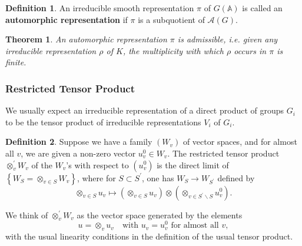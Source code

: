 \documentclass[11pt,english]{smfart}
\newtheorem{theorem}{Theorem}
\theoremstyle{definition}
\newtheorem{definition}{Definition}
\theoremstyle{remark}
\begin{document}
\begin{definition}
    An irreducible smooth representation $ \pi $ of $ G(\mathbb{A}) $ is called an \textbf{automorphic representation} if $ \pi $ is a subquotient of $ \mathcal{A}(G) $.
\end{definition}
\begin{theorem}
An automorphic representation $\pi$ is admissible, i.e. given any irreducible representation $\rho$ of $K$, the multiplicity with which $\rho$ occurs in $\pi$ is finite.
\end{theorem}
\subsubsection{Restricted Tensor Product}
We usually expect an irreducible representation of a direct product of groups $G_i$ to be the
tensor product of irreducible representations $V_i$ of $G_i$.
\begin{definition}
Suppose we have a family $ \left(W_{v}\right) $ of vector spaces, and for almost all $ v $, we are given a non-zero vector $ u_{v}^{0} \in W_{v} $. The restricted tensor product $ \otimes_{v}^{\prime} W_{v} $ of the $ W_{v} $'s with respect to $ \left(u_{v}^{0}\right) $ is the direct limit of $ \left\{W_{S}=\otimes_{v \in S} W_{v}\right\} $,
where for $ S \subset S^{\prime} $, one has $ W_{S} \longrightarrow W_{S^{\prime}} $ defined by
\[\otimes_{v \in S} u_{v} \mapsto\left(\otimes_{v \in S} u_{v}\right) \otimes\left(\otimes_{v \in S^{\prime} \backslash S} u_{v}^{0}\right) .\]
\end{definition}
We think of $ \otimes_{v}^{\prime} W_{v} $ as the vector space generated by the elements
\[u=\otimes_{v} u_{v} \quad\text{with } u_{v}=u_{v}^{0} \text{ for almost all } v,\]
with the usual linearity conditions in the definition of the usual tensor product.
\end{document}
